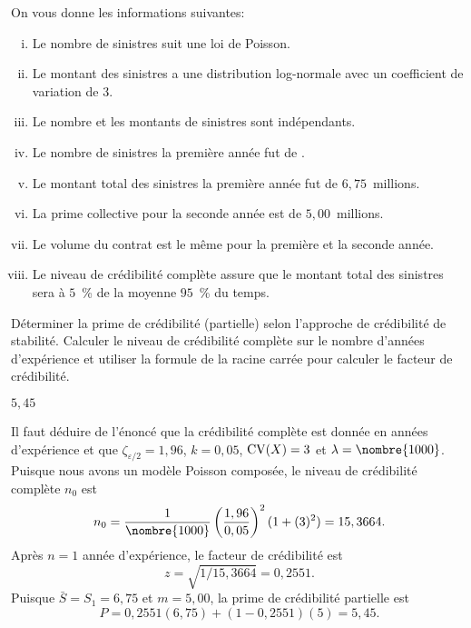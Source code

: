 \begin{exercice}
  On vous donne les informations suivantes:
  \begin{enumerate}[(i)]
  \item Le nombre de sinistres suit une loi de Poisson.
  \item Le montant des sinistres a une distribution log-normale avec un
    coefficient de variation de 3.
  \item Le nombre et les montants de sinistres sont indépendants.
  \item Le nombre de sinistres la première année fut de .
  \item Le montant total des sinistres la première année fut de
    $6,75$~millions.
  \item La prime collective pour la seconde année est de
    $5,00$~millions.
  \item Le volume du contrat est le même pour la première et la
    seconde année.
  \item Le niveau de crédibilité complète assure que le montant total
    des sinistres sera à $5$~\% de la moyenne $95$~\% du temps.
  \end{enumerate}
  Déterminer la prime de crédibilité (partielle) selon l'approche de
  crédibilité de stabilité. Calculer le niveau de crédibilité complète
  sur le nombre d'années d'expérience et utiliser la formule de la
  racine carrée pour calculer le facteur de crédibilité.
  \begin{rep}
    $5,45$
  \end{rep}
  \begin{sol}
    Il faut déduire de l'énoncé que la crédibilité complète est donnée
    en années d'expérience et que $\zeta_{\varepsilon/2} = 1,96$, $k =
    0,05$, $\operatorname{CV}(X) = 3$ et $\lambda = \nombre{1000}$. Puisque
    nous avons un modèle Poisson composée, le niveau de crédibilité
    complète $n_0$ est
    \begin{displaymath}
      n_0 =
      \frac{1}{\nombre{1000}}
      \left( \frac{1,96}{0,05} \right)^2
      (1 + (3)^2) =
      15,3664.
    \end{displaymath}
    Après $n = 1$ année d'expérience, le facteur de crédibilité est
    \begin{equation*}
      z = \sqrt{1/15,3664} = 0,2551.
    \end{equation*}
    Puisque $\bar{S} = S_1 = 6,75$ et $m = 5,00$, la prime de
    crédibilité partielle est
    \begin{displaymath}
      P = 0,2551 (6,75) + (1 - 0,2551) (5) = 5,45.
    \end{displaymath}
  \end{sol}
\end{exercice}

